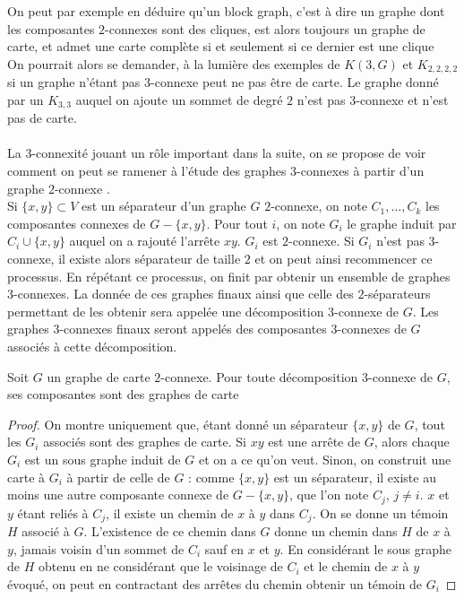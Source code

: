 \documentclass{scrartcl}
\begin{document}
\begin{flushleft}
On peut par exemple en déduire qu'un block graph, c'est à dire un graphe dont les composantes $2$-connexes sont des cliques,
est alors toujours un graphe de carte, et admet une carte complète si et seulement si ce dernier est une clique\\
On pourrait alors se demander, à la lumière des exemples de $K(3,G)$ et $K_{2,2,2,2}$ si un graphe n'étant pas $3$-connexe
peut ne pas être de carte. Le graphe donné par un $K_{3,3}$ auquel on ajoute un sommet de degré $2$ n'est pas $3$-connexe
et n'est pas de carte.
\\~\\
La $3$-connexité jouant un rôle important dans la suite, on se propose de voir comment on peut se ramener à l'étude des
graphes $3$-connexes à partir d'un graphe $2$-connexe \cite{3connComp}.\\
Si $\{x,y\} \subset V$ est un séparateur d'un graphe $G$ $2$-connexe, on note $C_1, ..., C_k$ les composantes connexes de
$G - \{x,y\}$. Pour tout $i$, on note $G_i$ le graphe induit par $C_i \cup \{x,y\}$ auquel on a rajouté l'arrête $xy$.
$G_i$ est $2$-connexe. Si $G_i$ n'est pas $3$-connexe, il existe alors séparateur de taille $2$ et on peut ainsi recommencer
ce processus. En répétant ce processus, on finit par obtenir un ensemble de graphes $3$-connexes. La donnée de ces graphes finaux
ainsi que celle des $2$-séparateurs permettant de les obtenir sera appelée une décomposition $3$-connexe de $G$.
Les graphes $3$-connexes finaux seront appelés des composantes $3$-connexes de $G$ associés à cette décomposition.

\begin{prop}\label{3connCompCarte}
    Soit $G$ un graphe de carte $2$-connexe. Pour toute décomposition $3$-connexe de $G$, ses composantes sont des graphes de carte
\end{prop}

\begin{proof}
    On montre uniquement que, étant donné un séparateur $\{x,y\}$ de $G$, tout les $G_i$ associés sont des graphes de carte.
    Si $xy$ est une arrête de $G$, alors chaque $G_i$ est un sous graphe induit de $G$ et on a ce qu'on veut. Sinon, on construit une
    carte à $G_i$ à partir de celle de $G$ : comme $\{x,y\}$ est un séparateur, il existe au moins une autre composante connexe de
    $G - \{x,y\}$, que l'on note $C_j$, $j \neq i$. $x$ et $y$ étant reliés à $C_j$, il existe un chemin de $x$ à $y$ dans $C_j$.
    On se donne un témoin $H$ associé à $G$. L'existence de ce chemin dans $G$ donne un chemin dans $H$ de $x$ à $y$, jamais voisin
    d'un sommet de $C_i$ sauf en $x$ et $y$. En considérant le sous graphe de $H$ obtenu en ne considérant que le voisinage de $C_i$ et le chemin
    de $x$ à $y$ évoqué, on peut en contractant des arrêtes du chemin obtenir un témoin de $G_i$
\end{proof}


\end{flushleft}
\end{document}
